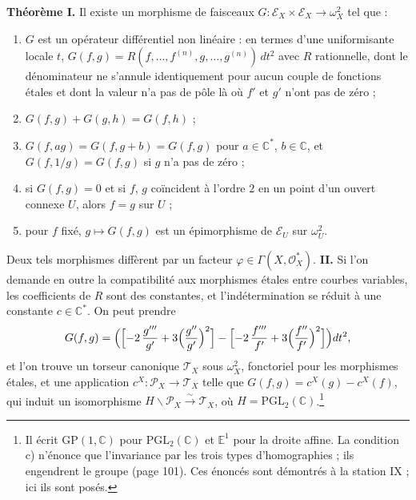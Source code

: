 \documentclass[11pt,a4paper]{article}
\begin{document}
\textbf{Théorème I.} Il existe un morphisme de faisceaux
$G : \mathcal{E}_X \times \mathcal{E}_X \to \omega_X^{2}$ tel que :
\begin{enumerate}
  \item[a)] $G$ est un opérateur différentiel non linéaire : en termes d'une
  uniformisante locale $t$, $G(f,g) = R(f,\ldots,f^{(n)}, g, \ldots,
  g^{(n)})\,dt^2$ avec $R$ rationnelle, dont le dénominateur ne s'annule
  identiquement pour aucun couple de fonctions étales et dont la valeur n'a
  pas de pôle là où $f'$ et $g'$ n'ont pas de zéro ;
  \item[b)] $G(f,g) + G(g,h) = G(f,h)$ ;
  \item[c)] $G(f, ag) = G(f, g + b) = G(f,g)$ pour $a \in \mathbb{C}^*$,
  $b \in \mathbb{C}$, et $G(f, 1/g) = G(f,g)$ si $g$ n'a pas de zéro ;
  \item[d)] si $G(f,g) = 0$ et si $f$, $g$ coïncident à l'ordre $2$ en un point
  d'un ouvert connexe $U$, alors $f = g$ sur $U$ ;
  \item[e)] pour $f$ fixé, $g \mapsto G(f,g)$ est un épimorphisme de
  $\mathcal{E}_U$ sur $\omega_U^2$.
\end{enumerate}
Deux tels morphismes diffèrent par un facteur $\varphi \in
\Gamma(X, \mathcal{O}_X^*)$. \textbf{II.} Si l'on demande en outre la
compatibilité aux morphismes étales entre courbes variables, les
coefficients de $R$ sont des constantes, et l'indétermination se réduit à
une constante $c \in \mathbb{C}^*$. On peut prendre
\[
  G(f,g) = \Bigl(\Bigl[-2\,\frac{g'''}{g'} + 3\Bigl(\frac{g''}{g'}\Bigr)^2\Bigr]
  - \Bigl[-2\,\frac{f'''}{f'} + 3\Bigl(\frac{f''}{f'}\Bigr)^2\Bigr]\Bigr)dt^2 ,
\]
et l'on trouve un torseur canonique $\mathcal{T}_X$ sous $\omega_X^2$,
fonctoriel pour les morphismes étales, et une application
$c^X : \mathcal{P}_X \to \mathcal{T}_X$ telle que $G(f,g) = c^X(g) - c^X(f)$,
qui induit un isomorphisme $H\backslash\mathcal{P}_X \xrightarrow{\sim}
\mathcal{T}_X$, où $H = \mathrm{PGL}_2(\mathbb{C})$.\footnote{Il écrit
$\mathrm{GP}(1,\mathbb{C})$ pour $\mathrm{PGL}_2(\mathbb{C})$ et
$\mathbb{E}^1$ pour la droite affine. La condition c) n'énonce que
l'invariance par les trois types d'homographies ; ils engendrent le groupe
(page 101). Ces énoncés sont démontrés à la station IX ; ici ils sont
posés.}
\end{document}
